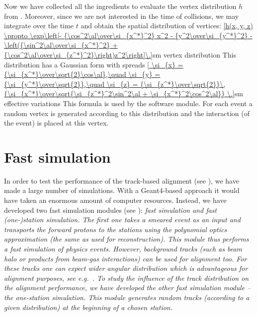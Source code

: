 Now we have collected all the ingredients to evaluate the vertex distribution $h$ from . Moreover, since we are not interested in the time of collisions, we may integrate over the time $t$ and obtain the spatial distribution of vertices:
\eqref{h(x, y, z) \propto \exp\left[- {\cos^2\al\over\si_{x^*}^2} x^2 - {y^2\over\si_{y^*}^2} - \left({\sin^2\al\over\si_{x^*}^2} + {\cos^2\al\over\si_{z^*}^2}\right)z^2\right]\.}{sm vertex distribution}
This distribution has a Gaussian form with spreads
\eqref{
	\si_{x} = {\si_{x^*}\over\sqrt{2}\cos\al},\quad
	\si_{y} = {\si_{y^*}\over\sqrt{2}},\quad
	\si_{z} = {\si_{z^*}\over\sqrt{2}}\,{\si_{x^*}\over\sqrt{\si_{z^*}^2\sin^2\al + \si_{x^*}^2\cos^2\al}} \.}{sm effective variations}
This formula is used by the software module. For each event a random vertex is generated according to this distribution and the interaction (of the event) is placed at this vertex.


\section[fast simu]{Fast simulation}

In order to test the performance of the track-based alignment (see ), we have made a large number of  simulations. With a Geant4-based approach it would have taken an enormous amount of computer resources. Instead, we have developed two fast simulation modules (see ): \em{fast simulation} and \em{fast (one-)station simulation}. The first one takes a smeared event as an input and transports the forward protons to the  stations using the polynomial optics approximation (the same as used for reconstruction). This module thus performs a fast simulation of physics events. However, background tracks (such as beam halo or products from beam-gas interactions) can be used for alignment too. For these tracks one can expect wider angular distribution which is advantageous for alignment purposes, see e.g.~. To study the influence of the track distribution on the alignment performance, we have developed the other fast simulation module -- the one-station simulation. This module generates random tracks (according to a given distribution) at the beginning of a chosen station.

